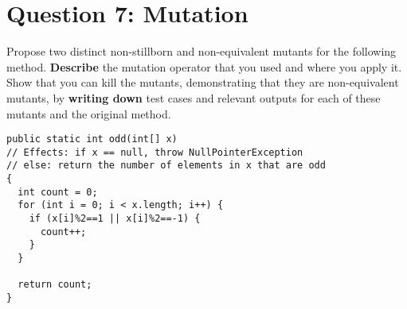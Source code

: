 \documentclass[12pt]{article}
\begin{document}
\newpage
\section*{Question 7: Mutation}

Propose two distinct non-stillborn and non-equivalent mutants for the
following method. {\bf Describe} the mutation operator that you used and where you
apply it. Show that you can kill the mutants, demonstrating that they
are non-equivalent mutants, by {\bf writing down} test cases and relevant
outputs for each of these mutants and the original method.

\begin{lstlisting}
public static int odd(int[] x)
// Effects: if x == null, throw NullPointerException
// else: return the number of elements in x that are odd
{
  int count = 0;
  for (int i = 0; i < x.length; i++) {
    if (x[i]%2==1 || x[i]%2==-1) {
      count++;
    }
  }
  
  return count;
}
\end{lstlisting}
\end{document}
